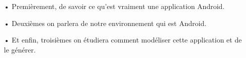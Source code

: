 \begin{itemize}
 \item[•]Premièrement, de savoir ce qu’est vraiment une application Android.
 \item[•]Deuxièmes on parlera de notre environnement qui est Android.
 \item[•]Et enfin, troisièmes on étudiera comment  modéliser cette application et de le générer.
\end{itemize}


